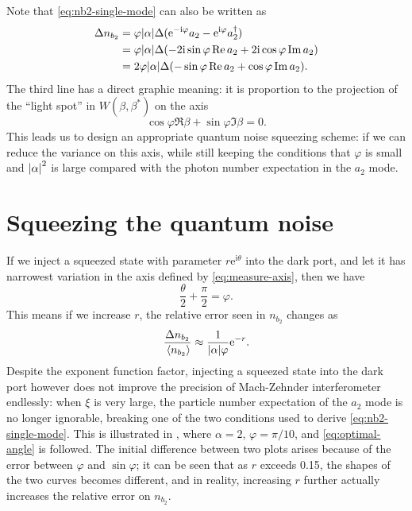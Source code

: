 \documentclass[hyperref, a4paper]{article}
\newcommand*{\ii}{\mathrm{i}}
\newcommand*{\ee}{\mathrm{e}}
\begin{document}
Note that \eqref{eq:nb2-single-mode} can also be written as  
\begin{equation}
    \begin{aligned}
        \Delta n_{b_2} &= \varphi \abs{\alpha} \Delta (\ee^{- \ii \varphi} a_2 - \ee^{\ii \varphi} a_2^\dagger)  \\
        &= \varphi \abs{\alpha} \Delta ( - 2 \ii \sin \varphi \Re a_2 + 2 \ii \cos \varphi \Im a_2 ) \\
        &= 2 \varphi \abs{\alpha} \Delta (- \sin \varphi \Re a_2 + \cos \varphi \Im a_2 ).
    \end{aligned}
\end{equation}
The third line has a direct graphic meaning:
it is proportion to the projection of the ``light spot'' in $W(\beta, \beta^*)$
on the axis 
\begin{equation}
    \cos \varphi \Re \beta + \sin \varphi \Im \beta = 0.
    \label{eq:measure-axis}
\end{equation}
This leads us to design an appropriate quantum noise squeezing scheme:
if we can reduce the variance on this axis,
while still keeping the conditions that $\varphi$ is small and 
$\abs{\alpha}^2$ is large compared with the photon number expectation in the $a_2$ mode.

\section{Squeezing the quantum noise}\label{sec:squeezing}

If we inject a squeezed state with parameter $r \ee^{\ii \theta}$ 
into the dark port,
and let it has narrowest variation in the axis defined by \eqref{eq:measure-axis}, 
then we have 
\begin{equation}
    \frac{\theta}{2} + \frac{\pi}{2} = \varphi.
    \label{eq:optimal-angle}
\end{equation}
This means if we increase $r$, 
the relative error seen in $n_{b_2}$ changes as 
\begin{equation}
    \frac{\Delta n_{b_2}}{\expval*{n_{b_2}}} \approx \frac{1}{\abs{\alpha} \varphi} \ee^{-r}.
    \label{eq:approx-squeezing}
\end{equation}
Despite the exponent function factor,
injecting a squeezed state into the dark port however does not improve 
the precision of Mach-Zehnder interferometer endlessly:
when $\xi$ is very large,
the particle number expectation of the $a_2$ mode is no longer ignorable,
breaking one of the two conditions used to derive \eqref{eq:nb2-single-mode}.
This is illustrated in ,
where $\alpha = 2$, $\varphi = \pi / 10$,
and \eqref{eq:optimal-angle} is followed.
The initial difference between two plots arises because of the error between $\varphi$ and $\sin \varphi$;
it can be seen that as $r$ exceeds 0.15,
the shapes of the two curves becomes different,
and in reality, increasing $r$ further actually increases the relative error on $n_{b_2}$.
\end{document}
